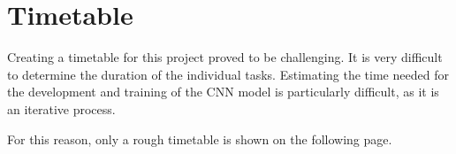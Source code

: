 \chapter{Timetable}
\label{ch:timetable}

Creating a timetable for this project proved to be challenging.
It is very difficult to determine the duration of the individual tasks.
Estimating the time needed for the development and training of the CNN model is particularly difficult, as it is an iterative process.

For this reason, only a rough timetable is shown on the following page.



